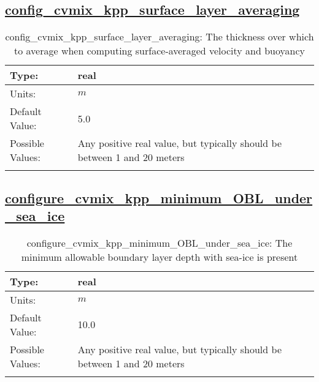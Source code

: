 \subsection[config\_cvmix\_kpp\_surface\_layer\_averaging]{\hyperref[sec:nm_tab_cvmix]{config\_cvmix\_kpp\_surface\_layer\_averaging}}
\label{subsec:nm_sec_config_cvmix_kpp_surface_layer_averaging}
\begin{center}
\begin{longtable}{| p{2.0in} || p{4.0in} |}
    \hline
    Type: & real \\
    \hline
    Units: & $m$ \\
    \hline
    Default Value: & 5.0 \\
    \hline
    Possible Values: & Any positive real value, but typically should be between 1 and 20 meters \\
    \hline
    \caption{config\_cvmix\_kpp\_surface\_layer\_averaging: The thickness over which to average when computing surface-averaged velocity and buoyancy}
\end{longtable}
\end{center}
\subsection[configure\_cvmix\_kpp\_minimum\_OBL\_under\_sea\_ice]{\hyperref[sec:nm_tab_cvmix]{configure\_cvmix\_kpp\_minimum\_OBL\_under\_sea\_ice}}
\label{subsec:nm_sec_configure_cvmix_kpp_minimum_OBL_under_sea_ice}
\begin{center}
\begin{longtable}{| p{2.0in} || p{4.0in} |}
    \hline
    Type: & real \\
    \hline
    Units: & $m$ \\
    \hline
    Default Value: & 10.0 \\
    \hline
    Possible Values: & Any positive real value, but typically should be between 1 and 20 meters \\
    \hline
    \caption{configure\_cvmix\_kpp\_minimum\_OBL\_under\_sea\_ice: The minimum allowable boundary layer depth with sea-ice is present}
\end{longtable}
\end{center}
